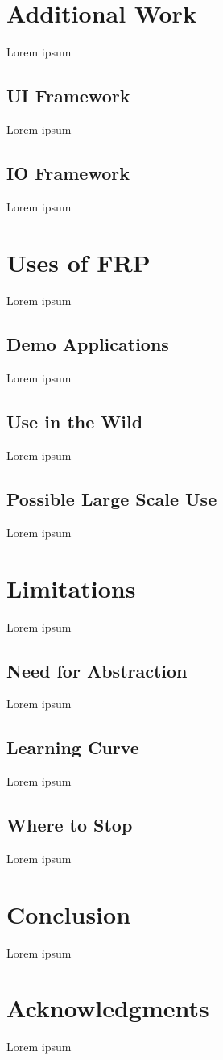 \documentclass{article}
\begin{document}
  \section{Additional Work}
    Lorem ipsum
    \subsection{UI Framework}
    Lorem ipsum
    \subsection{IO Framework}
    Lorem ipsum
  \section{Uses of FRP}
  Lorem ipsum
    \subsection{Demo Applications}
    Lorem ipsum
    \subsection{Use in the Wild}
    Lorem ipsum
    \subsection{Possible Large Scale Use}
    Lorem ipsum
  \section{Limitations}
    Lorem ipsum
    \subsection{Need for Abstraction}
    Lorem ipsum
    \subsection{Learning Curve}
    Lorem ipsum
    \subsection{Where to Stop}
    Lorem ipsum
  \section{Conclusion}
  Lorem ipsum
  \section{Acknowledgments}
  Lorem ipsum
\end{document}
